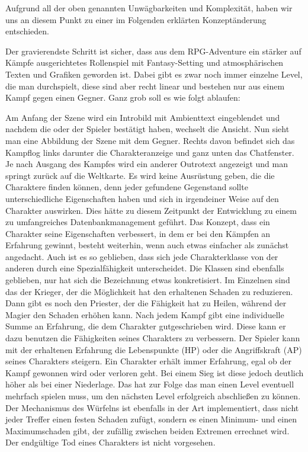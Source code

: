 Aufgrund all der oben genannten Unwägbarkeiten und Komplexität, haben wir uns an diesem Punkt zu einer im Folgenden erklärten Konzeptänderung entschieden.

Der gravierendste Schritt ist sicher, dass aus dem RPG-Adventure ein stärker auf Kämpfe ausgerichtetes Rollenspiel mit Fantasy-Setting und atmosphärischen Texten und Grafiken geworden ist. Dabei gibt es zwar noch immer einzelne Level, die man durchspielt, diese sind aber recht linear und bestehen nur aus einem Kampf gegen einen Gegner. Ganz grob soll es wie folgt ablaufen:

Am Anfang der Szene wird ein Introbild mit Ambienttext eingeblendet und nachdem die oder der Spieler bestätigt haben, wechselt die Ansicht. Nun sieht man eine Abbildung der Szene mit dem Gegner. Rechts davon befindet sich das Kampflog links darunter die Charakteranzeige und ganz unten das Chatfenster. Je nach Ausgang des Kampfes wird ein anderer Outrotext angezeigt und man springt zurück auf die Weltkarte. Es wird keine Ausrüstung geben, die die Charaktere finden können, denn jeder gefundene Gegenstand sollte unterschiedliche Eigenschaften haben und sich in irgendeiner Weise auf den Charakter auswirken. Dies hätte zu diesem Zeitpunkt der Entwicklung zu einem zu umfangreiches Datenbankmanagement geführt. Das Konzept, dass ein Charakter seine Eigenschaften verbessert, in dem er bei den Kämpfen an Erfahrung gewinnt, besteht weiterhin, wenn auch etwas einfacher als zunächst angedacht. Auch ist es so geblieben, dass sich jede Charakterklasse von der anderen durch eine Spezialfähigkeit unterscheidet. Die Klassen sind ebenfalls geblieben, nur hat sich die Bezeichnung etwas konkretisiert. Im Einzelnen sind das der Krieger, der die Möglichkeit hat den erhaltenen Schaden zu reduzieren. Dann gibt es noch den Priester, der die Fähigkeit hat zu Heilen, während der Magier den Schaden erhöhen kann. Nach jedem Kampf gibt eine individuelle Summe an Erfahrung, die dem Charakter gutgeschrieben wird. Diese kann er dazu benutzen die Fähigkeiten seines Charakters zu verbessern. Der Spieler kann mit der erhaltenen Erfahrung die Lebenspunkte (HP) oder die Angriffskraft (AP) seines Charakters steigern. Ein Charakter erhält immer Erfahrung, egal ob der Kampf gewonnen wird oder verloren geht. Bei einem Sieg ist diese jedoch deutlich höher als bei einer Niederlage. Das hat zur Folge das man einen Level eventuell mehrfach spielen muss, um den nächsten Level erfolgreich abschließen zu können. Der Mechanismus des Würfelns ist ebenfalls in der Art implementiert, dass nicht jeder Treffer einen festen Schaden zufügt, sondern es einen Minimum- und einen Maximumschaden gibt, der zufällig zwischen beiden Extremen errechnet wird. Der endgültige Tod eines Charakters ist nicht vorgesehen. 

